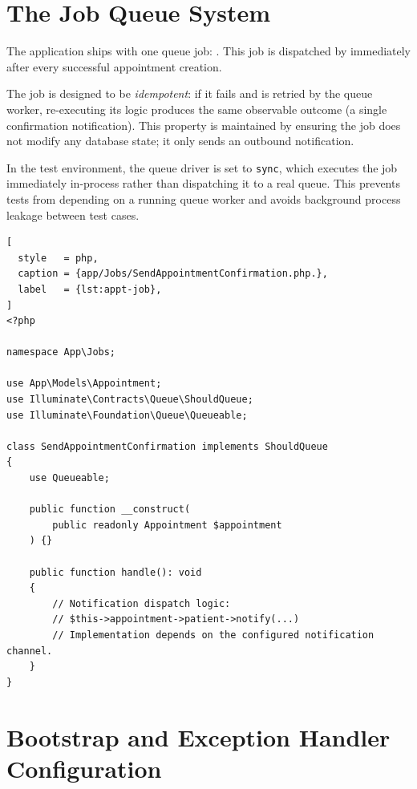 \section{The Job Queue System}
\label{sec:jobs}

The application ships with one queue job:
. This job is dispatched by
 immediately after every successful
appointment creation.

The job is designed to be \emph{idempotent}: if it fails and is retried
by the queue worker, re-executing its logic produces the same observable
outcome (a single confirmation notification). This property is
maintained by ensuring the job does not modify any database state; it
only sends an outbound notification.

In the test environment, the queue driver is set to \texttt{sync},
which executes the job immediately in-process rather than dispatching
it to a real queue. This prevents tests from depending on a running
queue worker and avoids background process leakage between test cases.

\begin{lstlisting}[
  style   = php,
  caption = {app/Jobs/SendAppointmentConfirmation.php.},
  label   = {lst:appt-job},
]
<?php

namespace App\Jobs;

use App\Models\Appointment;
use Illuminate\Contracts\Queue\ShouldQueue;
use Illuminate\Foundation\Queue\Queueable;

class SendAppointmentConfirmation implements ShouldQueue
{
    use Queueable;

    public function __construct(
        public readonly Appointment $appointment
    ) {}

    public function handle(): void
    {
        // Notification dispatch logic:
        // $this->appointment->patient->notify(...)
        // Implementation depends on the configured notification channel.
    }
}
\end{lstlisting}

\section{Bootstrap and Exception Handler Configuration}
\label{sec:bootstrap}

